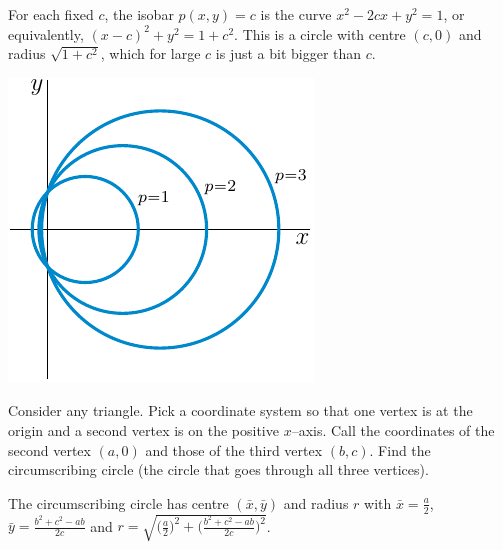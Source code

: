 \begin{solution}
For each fixed $c$, the isobar $p(x,y)=c$ is the curve
$x^2-2cx+y^2=1$, or equivalently, $(x-c)^2+y^2=1+c^2$. This is a 
circle with centre $(c,0)$ and radius $\sqrt{1+c^2}$, which for large $c$ is just a bit bigger than $c$.

\begin{center}
     \includegraphics{fig/pressure.pdf}
\end{center}


\end{solution}


\begin{question}
Consider any triangle. Pick a coordinate system so that one vertex
is at the origin and a second vertex is on the positive $x$--axis. Call
the coordinates of the second vertex $(a,0)$ and those of the third vertex
$(b,c)$. Find the circumscribing circle (the circle that goes through all
three vertices).
\end{question}

%


\begin{answer}
The circumscribing circle has centre $(\bar x,\bar y)$ and radius $r$
with $\bar x=\frac{a}{2}$, $\bar y=\frac{b^2+c^2-ab}{2c}$ and
$r=\sqrt{\big(\frac{a}{2}\big)^2+\big(\frac{b^2+c^2-ab}{2c}\big)^2}$.
\end{answer}



